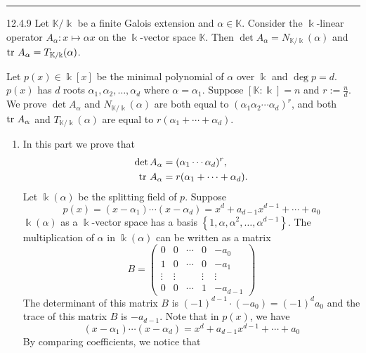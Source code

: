 \documentclass[a4paper, 12pt]{article}
\begin{document}
\noindent\rule{7in}{2.8pt}
\begin{problem}{12.4.9}
Let \(\mathbb{K}/\Bbbk\) be a finite Galois extension and \(\alpha\in \mathbb{K}\). Consider the \(\Bbbk\)-linear operator \(A_\alpha:x\mapsto \alpha x\) on the \(\Bbbk\)-vector space \(\mathbb{K}\). Then \(\det A_\alpha=N_{\mathbb{K}/\Bbbk}(\alpha)\) and 
\(\text{tr}\  A_\alpha=T_{\mathbb{K}/\Bbbk}(\alpha)\).
\end{problem}
\begin{solution}
Let \(p(x)\in \Bbbk[x]\) be the minimal polynomial of \(\alpha\) over \(\Bbbk\) and \(\deg p=d\). \(p(x)\) has \(d\) roots \(\alpha_1,\alpha_2,\ldots,\alpha_d\) where \(\alpha=\alpha_1\). Suppose \([\mathbb{K}:\Bbbk]=n\) and \(r:=\frac{n}{d}\). We prove 
\(\det A_\alpha\) and \(N_{\mathbb{K}/\Bbbk}(\alpha)\) are both equal to \((\alpha_1\alpha_2\cdots \alpha_d)^r\), and both \(\text{tr}\  A_\alpha\) and \(T_{\mathbb{K}/\Bbbk}(\alpha) \) are equal to \(r(\alpha_1+\cdots +\alpha_d)\). 
\begin{enumerate}[(1)]
\item In this part we prove that 
\begin{align*}
    \det A_\alpha&=(\alpha_1\cdots \alpha_d)^r,\\
    \text{tr}\  A_\alpha&=r(\alpha_1+\cdots+\alpha_d).
\end{align*}
Let \(\Bbbk(\alpha)\) be the splitting field of \(p\). Suppose 
\[p(x)=(x-\alpha_1)\cdots (x-\alpha_d)=x^d+a_{d-1}x^{d-1}+\cdots+a_0\] 
\(\Bbbk(\alpha)\) as a \(\Bbbk\)-vector space has a basis \(\left\{ 1,\alpha,\alpha^2,\ldots, \alpha^{d-1} \right\}\). The multiplication of \(\alpha\) in \(\Bbbk(\alpha)\) can be written as a matrix 
\[B=\begin{pmatrix}
   0&0&\cdots&0&-a_0\\ 
   1&0&\cdots&0&-a_1\\ 
   \vdots&\vdots&&\vdots&\vdots\\ 
   0&0&\cdots&1&-a_{d-1}
\end{pmatrix}\]
The determinant of this matrix \(B\) is \((-1)^{d-1}\cdot (-a_0)=(-1)^d a_0\) and the trace of this matrix \(B\) is \(-a_{d-1}\). Note that in \(p(x)\), we have 
\[(x-\alpha_1)\cdots (x-\alpha_d)=x^d+a_{d-1}x^{d-1}+\cdots+a_0\]
By comparing coefficients, we notice that 
\begin{align*}

\end{align*}
\end{enumerate}
\end{solution}
\end{document}
